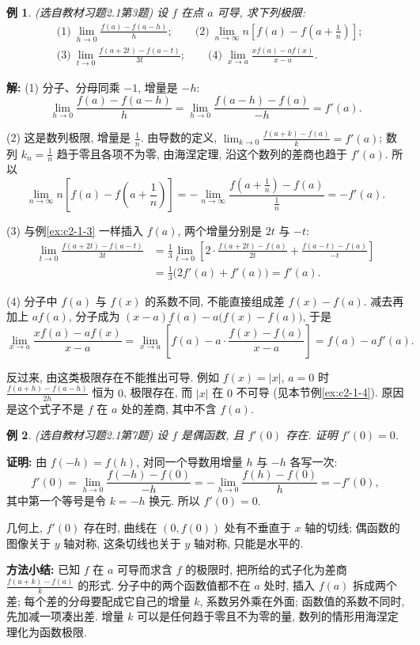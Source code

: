 \documentclass[UTF8,openany]{ctexbook}
\theoremstyle{chinesetextbook}
\newtheorem{example}{例}[section]
\newenvironment{cnproof}{\par\indent\textbf{证明:} \ignorespaces}{\par}
\newenvironment{cnsolution}{\par\indent\textbf{解:} \ignorespaces}{\par}
\begin{document}
\begin{example}\label{ex:c2-h1-3}
\textnormal{(选自教材习题2.1第3题)} 设 $f$ 在点 $a$ 可导, 求下列极限:
\[
\begin{aligned}
&\text{(1)}\ \lim_{h\to0}\frac{f(a)-f(a-h)}h;\qquad\text{(2)}\ \lim_{n\to\infty}n\left[f(a)-f\left(a+\frac1n\right)\right];\\
&\text{(3)}\ \lim_{t\to0}\frac{f(a+2t)-f(a-t)}{3t};\qquad\text{(4)}\ \lim_{x\to a}\frac{xf(a)-af(x)}{x-a}.
\end{aligned}
\]
\end{example}
\begin{cnsolution}
(1) 分子、分母同乘 $-1$, 增量是 $-h$:
\[
\lim_{h\to0}\frac{f(a)-f(a-h)}h=\lim_{h\to0}\frac{f(a-h)-f(a)}{-h}=f'(a).
\]

(2) 这是数列极限, 增量是 $\displaystyle\frac1n$. 由导数的定义, $\displaystyle\lim_{k\to0}\frac{f(a+k)-f(a)}k=f'(a)$; 数列 $\displaystyle k_n=\frac1n$ 趋于零且各项不为零, 由海涅定理, 沿这个数列的差商也趋于 $f'(a)$. 所以
\[
\lim_{n\to\infty}n\left[f(a)-f\left(a+\frac1n\right)\right]=-\lim_{n\to\infty}\frac{f\left(a+\frac1n\right)-f(a)}{\frac1n}=-f'(a).
\]

(3) 与例\ref{ex:c2-1-3} 一样插入 $f(a)$, 两个增量分别是 $2t$ 与 $-t$:
\[
\begin{aligned}
\lim_{t\to0}\frac{f(a+2t)-f(a-t)}{3t}&=\frac13\lim_{t\to0}\left[2\cdot\frac{f(a+2t)-f(a)}{2t}+\frac{f(a-t)-f(a)}{-t}\right]\\
&=\frac13\bigl(2f'(a)+f'(a)\bigr)=f'(a).
\end{aligned}
\]

(4) 分子中 $f(a)$ 与 $f(x)$ 的系数不同, 不能直接组成差 $f(x)-f(a)$. 减去再加上 $af(a)$, 分子成为 $(x-a)f(a)-a\bigl(f(x)-f(a)\bigr)$, 于是
\[
\lim_{x\to a}\frac{xf(a)-af(x)}{x-a}=\lim_{x\to a}\left[f(a)-a\cdot\frac{f(x)-f(a)}{x-a}\right]=f(a)-af'(a).
\]
\end{cnsolution}
反过来, 由这类极限存在不能推出可导. 例如 $f(x)=|x|$, $a=0$ 时 $\displaystyle\frac{f(a+h)-f(a-h)}{2h}$ 恒为 $0$, 极限存在, 而 $|x|$ 在 $0$ 不可导 (见本节例\ref{ex:c2-1-4}). 原因是这个式子不是 $f$ 在 $a$ 处的差商, 其中不含 $f(a)$.
\begin{example}\label{ex:c2-h1-7}
\textnormal{(选自教材习题2.1第7题)} 设 $f$ 是偶函数, 且 $f'(0)$ 存在. 证明 $f'(0)=0$.
\end{example}
\begin{cnproof}
由 $f(-h)=f(h)$, 对同一个导数用增量 $h$ 与 $-h$ 各写一次:
\[
f'(0)=\lim_{h\to0}\frac{f(-h)-f(0)}{-h}=-\lim_{h\to0}\frac{f(h)-f(0)}h=-f'(0),
\]
其中第一个等号是令 $k=-h$ 换元. 所以 $f'(0)=0$.
\end{cnproof}
几何上, $f'(0)$ 存在时, 曲线在 $(0,f(0))$ 处有不垂直于 $x$ 轴的切线; 偶函数的图像关于 $y$ 轴对称, 这条切线也关于 $y$ 轴对称, 只能是水平的.
\par\indent\textbf{方法小结:} 已知 $f$ 在 $a$ 可导而求含 $f$ 的极限时, 把所给的式子化为差商 $\displaystyle\frac{f(a+k)-f(a)}k$ 的形式. 分子中的两个函数值都不在 $a$ 处时, 插入 $f(a)$ 拆成两个差; 每个差的分母要配成它自己的增量 $k$, 系数另外乘在外面; 函数值的系数不同时, 先加减一项凑出差. 增量 $k$ 可以是任何趋于零且不为零的量, 数列的情形用海涅定理化为函数极限.
\end{document}
